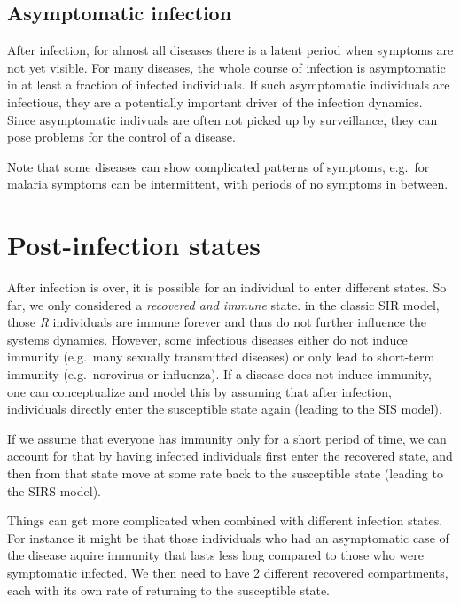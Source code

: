 \documentclass[]{book}
\theoremstyle{definition}
\theoremstyle{definition}
\theoremstyle{definition}
\theoremstyle{remark}
\begin{document}
\subsection{Asymptomatic infection}\label{asymptomatic-infection}

After infection, for almost all diseases there is a latent period when
symptoms are not yet visible. For many diseases, the whole course of
infection is asymptomatic in at least a fraction of infected
individuals. If such asymptomatic individuals are infectious, they are a
potentially important driver of the infection dynamics. Since
asymptomatic indivuals are often not picked up by surveillance, they can
pose problems for the control of a disease.

Note that some diseases can show complicated patterns of symptoms,
e.g.~for malaria symptoms can be intermittent, with periods of no
symptoms in between.

\section{Post-infection states}\label{post-infection-states}

After infection is over, it is possible for an individual to enter
different states. So far, we only considered a \emph{recovered and
immune} state. in the classic SIR model, those \emph{R} individuals are
immune forever and thus do not further influence the systems dynamics.
However, some infectious diseases either do not induce immunity
(e.g.~many sexually transmitted diseases) or only lead to short-term
immunity (e.g.~norovirus or influenza). If a disease does not induce
immunity, one can conceptualize and model this by assuming that after
infection, individuals directly enter the susceptible state again
(leading to the SIS model).

If we assume that everyone has immunity only for a short period of time,
we can account for that by having infected individuals first enter the
recovered state, and then from that state move at some rate back to the
susceptible state (leading to the SIRS model).

Things can get more complicated when combined with different infection
states. For instance it might be that those individuals who had an
asymptomatic case of the disease aquire immunity that lasts less long
compared to those who were symptomatic infected. We then need to have 2
different recovered compartments, each with its own rate of returning to
the susceptible state.
\end{document}
